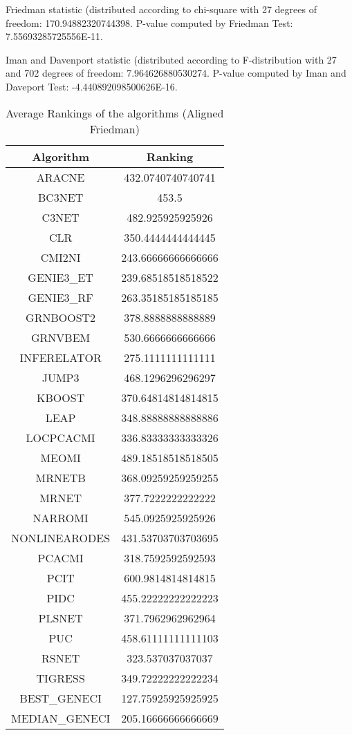 \documentclass[a4paper,10pt]{article}
\begin{document}
\begin{landscape}
Friedman statistic (distributed according to chi-square with 27 degrees of freedom: 170.94882320744398. 
P-value computed by Friedman Test: 7.55693285725556E-11.\newline

Iman and Davenport statistic (distributed according to F-distribution with 27 and 702 degrees of freedom: 7.964626880530274. 
P-value computed by Iman and Daveport Test: -4.440892098500626E-16.\newline


\newpage

\begin{table}[!htp]
\centering
\caption{Average Rankings of the algorithms (Aligned Friedman)
}\begin{tabular}{c|c}
Algorithm&Ranking\\
\hline
ARACNE&432.0740740740741\\
BC3NET&453.5\\
C3NET&482.925925925926\\
CLR&350.4444444444445\\
CMI2NI&243.66666666666666\\
GENIE3_ET&239.68518518518522\\
GENIE3_RF&263.35185185185185\\
GRNBOOST2&378.8888888888889\\
GRNVBEM&530.6666666666666\\
INFERELATOR&275.1111111111111\\
JUMP3&468.1296296296297\\
KBOOST&370.64814814814815\\
LEAP&348.88888888888886\\
LOCPCACMI&336.83333333333326\\
MEOMI&489.18518518518505\\
MRNETB&368.09259259259255\\
MRNET&377.7222222222222\\
NARROMI&545.0925925925926\\
NONLINEARODES&431.53703703703695\\
PCACMI&318.7592592592593\\
PCIT&600.9814814814815\\
PIDC&455.22222222222223\\
PLSNET&371.7962962962964\\
PUC&458.61111111111103\\
RSNET&323.537037037037\\
TIGRESS&349.72222222222234\\
BEST_GENECI&127.75925925925925\\
MEDIAN_GENECI&205.16666666666669\\
\end{tabular}
\end{table}



\end{landscape}
\end{document}
